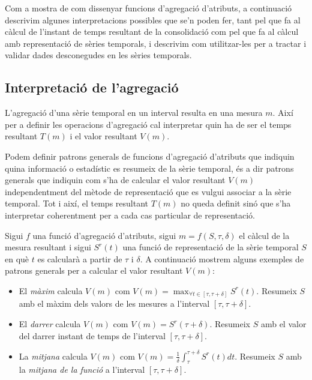 Com a mostra de com dissenyar funcions d'agregació d'atributs, a
continuació descrivim algunes interpretacions possibles que se'n poden
fer, tant pel que fa al càlcul de l'instant de temps resultant de la
consolidació com pel que fa al càlcul amb representació de sèries
temporals, i descrivim com utilitzar-les per a tractar i validar dades
desconegudes en les sèries temporals.



\subsection{Interpretació de l'agregació}


L'agregació d'una sèrie temporal en un interval resulta en una mesura
$m$. Així per a definir les operacions d'agregació cal
interpretar quin ha de ser el temps resultant $T(m)$ i el valor
resultant $V(m)$.


Podem definir patrons generals de funcions d'agregació d'atributs que
indiquin quina informació o estadístic es resumeix de la sèrie
temporal, és a dir patrons generals que indiquin com s'ha de calcular
el valor resultant $V(m)$ independentment del mètode de representació
que es vulgui associar a la sèrie temporal.  Tot i així, el temps
resultant $T(m)$ no queda definit sinó que s'ha interpretar
coherentment per a cada cas particular de representació.


Sigui $f$ una funció d'agregació d'atributs, sigui
$m=f(S,\tau,\delta)$ el càlcul de la mesura resultant i sigui $S^r(t)$
una funció de representació de la sèrie temporal $S$ en què $t$ es
calcularà a partir de $\tau$ i $\delta$.
%
A continuació mostrem alguns exemples de patrons generals per a
calcular el valor resultant $V(m)$:
\begin{itemize}
\item El \emph{màxim} calcula $V(m)$ com $V(m) = \max_{\forall t \in
    [\tau, \tau+\delta]}S^r(t)$. Resumeix $S$ amb el màxim dels valors de les
  mesures a l'interval $[\tau, \tau+\delta]$.
\item El \emph{darrer} calcula $V(m)$ com $V(m) =
  S^r(\tau+\delta)$. Resumeix $S$ amb el valor del darrer instant de
  temps de l'interval $[\tau, \tau+\delta]$.

\item La \emph{mitjana} calcula $V(m)$ com $V(m) = \frac{1}{\delta}
  \int_{\tau}^{\tau+\delta} S^r(t)dt$. Resumeix $S$ amb la
  \emph{mitjana de la funció} \parencite{weisstein:averagefunction} a
  l'interval $[\tau, \tau+\delta]$.  \label{sec:sgstm:mitjanafuncio}

\end{itemize}




